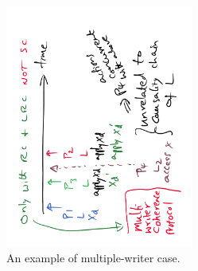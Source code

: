 \documentclass[11pt]{lecture}
\def\fullsize{0.55\textwidth}
\begin{document}
\begin{figure}[!htbp]
\centering 
\includegraphics[width=\fullsize, angle=-90]{Figures/example-mwcp}
\caption{An example of multiple-writer case.}\label{fig: mwcp-example}
\end{figure}
\end{document}
